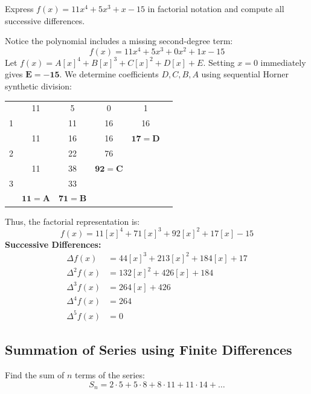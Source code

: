 \documentclass[11pt,a4paper]{article}
\begin{document}
\begin{exambox}
Express $f(x) = 11x^4 + 5x^3 + x - 15$ in factorial notation and compute all successive differences.
\end{exambox}

\begin{solbox}
Notice the polynomial includes a missing second-degree term:
$$f(x) = 11x^4 + 5x^3 + 0x^2 + 1x - 15$$
Let $f(x) = A[x]^4 + B[x]^3 + C[x]^2 + D[x] + E$.
Setting $x = 0$ immediately gives $\mathbf{E = -15}$.
We determine coefficients $D, C, B, A$ using sequential Horner synthetic division:
\begin{center}
\begin{tabular}{c|ccccc}
    & 11 & 5 & 0 & 1 \\
    1 & & 11 & 16 & 16 \\
    \hline
    & 11 & 16 & 16 & $\mathbf{17 = D}$ \\
    2 & & 22 & 76 & \\
    \hline
    & 11 & 38 & $\mathbf{92 = C}$ & \\
    3 & & 33 & & \\
    \hline
    & $\mathbf{11 = A}$ & $\mathbf{71 = B}$ & &
\end{tabular}
\end{center}
Thus, the factorial representation is:
\begin{equation}
    \boxed{f(x) = 11[x]^4 + 71[x]^3 + 92[x]^2 + 17[x] - 15}
\end{equation}
\textbf{Successive Differences:}
\begin{align*}
    \Delta f(x) &= 44[x]^3 + 213[x]^2 + 184[x] + 17 \\
    \Delta^2 f(x) &= 132[x]^2 + 426[x] + 184 \\
    \Delta^3 f(x) &= 264[x] + 426 \\
    \Delta^4 f(x) &= 264 \\
    \Delta^5 f(x) &= 0
\end{align*}
\end{solbox}

\subsection{Summation of Series using Finite Differences}

\begin{exambox}
Find the sum of $n$ terms of the series:
$$S_n = 2\cdot 5 + 5\cdot 8 + 8\cdot 11 + 11\cdot 14 + \dots$$
\end{exambox}
\end{document}
